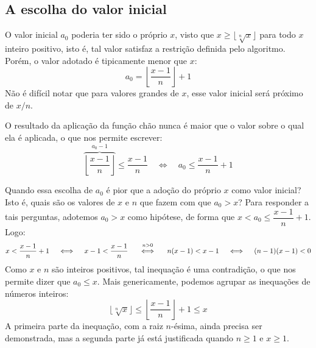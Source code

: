 \subsection*{A escolha do valor inicial}

O valor inicial $a_0$ poderia ter sido o próprio $x$,
visto que $x \ge \lfloor \sqrt[n]{x} \rfloor$
para todo $x$ inteiro positivo,
isto é, tal valor satisfaz a restrição definida pelo algoritmo.
Porém, o valor adotado é tipicamente menor que $x$:
\[
  a_0 = \left\lfloor \dfrac{x - 1}{n} \right\rfloor + 1
\]
Não é difícil notar que para valores grandes de $x$,
esse valor inicial será próximo de $x/n$.

O resultado da aplicação da função chão
nunca é maior que o valor sobre o qual ela é aplicada,
o que nos permite escrever:
\[
  \overbrace{\left\lfloor \dfrac{x - 1}{n} \right\rfloor}^{a_0 - 1}
  \le \dfrac{x - 1}{n}
  \quad\iff\quad
  a_0 \le \dfrac{x - 1}{n} + 1
\]

Quando essa escolha de $a_0$
é pior que a adoção do próprio $x$ como valor inicial?
Isto é, quais são os valores de $x$ e $n$
que fazem com que $a_0 > x$?
Para responder a tais perguntas,
adotemos $a_0 > x$ como hipótese,
de forma que $x < a_0 \le \dfrac{x - 1}{n} + 1$.
Logo:
\[
  x < \dfrac{x - 1}{n} + 1
  \quad\iff\quad
  x - 1 < \dfrac{x - 1}{n}
  \quad\stackfirst{n > 0}{\iff}\quad
  n(x - 1) < x - 1
  \quad\iff\quad
  (n - 1)(x - 1) < 0
\]
Como $x$ e $n$ são inteiros positivos,
tal inequação é uma contradição,
o que nos permite dizer que $a_0 \le x$.
Mais genericamente,
podemos agrupar as inequações de números inteiros:
\[
  \lfloor \sqrt[n]{x} \rfloor
  \le
  \left\lfloor \dfrac{x - 1}{n} \right\rfloor + 1
  \le
  x
\]
A primeira parte da inequação, com a raiz $n$-ésima,
ainda precisa ser demonstrada,
mas a segunda parte já está justificada quando $n \ge 1$ e $x \ge 1$.
